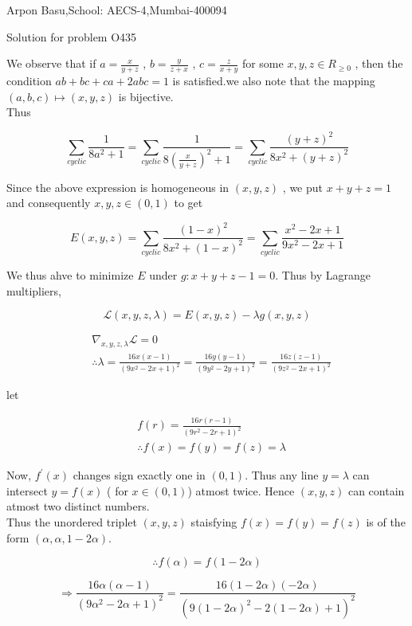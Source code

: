 \documentclass[a4paper,10pt]{article}
\begin{document}
\begin{center}


Arpon Basu,School: AECS-4,Mumbai-400094

Solution for problem O435
\end{center}


We observe that if $a=\frac{x}{y+z}$ , $b=\frac{y}{z+x}$ , $c=\frac{z}{x+y}$ for some $x,y,z \in R_{\ge 0}$ , then the condition
$ab+bc+ca+2abc=1$ is satisfied.we also note that the mapping $(a,b,c) \mapsto (x,y,z)$ is bijective.\\
Thus

$$\sum_{cyclic} \frac{1}{8a^2 +1} = \sum_{cyclic} \frac{1}{8(\frac{x}{y+z})^2 +1}  = \sum_{cyclic} \frac{(y+z)^2}{8x^2 + (y+z)^2} $$

Since the above expression is homogeneous in $(x,y,z)$ , we put $x+y+z=1$ and consequently $x,y,z \in (0,1)$ to get 

$$E(x,y,z)= \sum_{cyclic} \frac{(1-x)^2}{8x^2 + (1-x)^2} =  \sum_{cyclic} \frac{x^2 -2x+1}{9x^2 -2x+1} $$

We thus ahve to minimize $E$ under $g: x+y+z-1=0$. Thus by Lagrange multipliers,

  $$\mathcal{L}(x,y,z,\lambda)=E(x,y,z)-\lambda g(x,y,z) $$



\begin{align*}
 &\nabla_{x,y,z,\lambda} \mathcal{L}=0 \\
 &\therefore \lambda = \frac{16x(x-1)}{(9x^2 -2x+1)^2}=\frac{16y(y-1)}{(9y^2 -2y+1)^2}=\frac{16z(z-1)}{(9z^2 -2x+1)^2}
\end{align*}

let 

\begin{align*}
 & f(r)=\frac{16r(r-1)}{(9r^2 -2r+1)^2} \\
 & \therefore f(x)=f(y)=f(z)=\lambda
\end{align*}

Now, $f^{'}(x)$ changes sign exactly one in $(0,1)$. Thus any line $y=\lambda $ can intersect $y=f(x)$ ( for $x\in(0,1)$) atmost twice. 
Hence $(x,y,z)$ can contain atmost two distinct numbers.\\
Thus the unordered triplet $(x,y,z)$ staisfying $f(x)=f(y)=f(z)$ is of the form $(\alpha,\alpha,1-2\alpha)$.

$$ \therefore f(\alpha)=f(1-2\alpha) $$

\begin{equation}
  \Rightarrow \frac{16\alpha(\alpha-1)}{(9\alpha^2 -2\alpha+1)^2}=\frac{16(1-2\alpha)(-2\alpha)}{(9(1-2\alpha)^2-2(1-2\alpha)+1)^2}
\end{equation}
\end{document}
